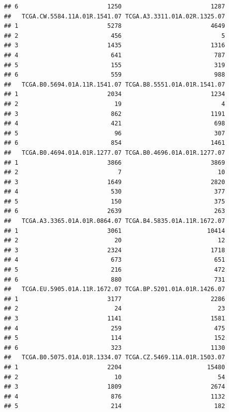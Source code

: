 \documentclass[
]{article}
\begin{document}
\begin{verbatim}
## 6                         1250                         1287
##   TCGA.CW.5584.11A.01R.1541.07 TCGA.A3.3311.01A.02R.1325.07
## 1                         5278                         4649
## 2                          456                            5
## 3                         1435                         1316
## 4                          641                          787
## 5                          155                          319
## 6                          559                          988
##   TCGA.B0.5694.01A.11R.1541.07 TCGA.B8.5551.01A.01R.1541.07
## 1                         2034                         1234
## 2                           19                            4
## 3                          862                         1191
## 4                          421                          698
## 5                           96                          307
## 6                          854                         1461
##   TCGA.B0.4694.01A.01R.1277.07 TCGA.B0.4696.01A.01R.1277.07
## 1                         3866                         3869
## 2                            7                           10
## 3                         1649                         2820
## 4                          530                          377
## 5                          150                          375
## 6                         2639                          263
##   TCGA.A3.3365.01A.01R.0864.07 TCGA.B4.5835.01A.11R.1672.07
## 1                         3061                        10414
## 2                           20                           12
## 3                         2324                         1718
## 4                          673                          651
## 5                          216                          472
## 6                          880                          731
##   TCGA.EU.5905.01A.11R.1672.07 TCGA.BP.5201.01A.01R.1426.07
## 1                         3177                         2286
## 2                           24                           23
## 3                         1141                         1581
## 4                          259                          475
## 5                          114                          152
## 6                          323                         1130
##   TCGA.B0.5075.01A.01R.1334.07 TCGA.CZ.5469.11A.01R.1503.07
## 1                         2204                        15480
## 2                           10                           54
## 3                         1809                         2674
## 4                          876                         1132
## 5                          214                          182

\end{verbatim}
\end{document}
